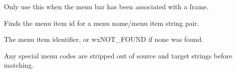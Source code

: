 
Only use this when the menu bar has been
associated with a frame.

\label{wxmenubarfindmenuitem}


Finds the menu item id for a menu name/menu item string pair.





The menu item identifier, or wxNOT_FOUND if none was found.


Any special menu codes are stripped out of source and target strings
before matching.

\label{wxmenubarfinditem}

